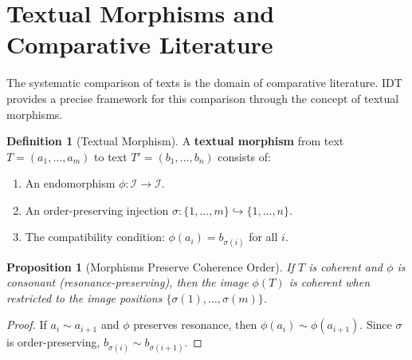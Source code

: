 \documentclass[11pt,openany]{book}
\theoremstyle{definition}
\newtheorem{definition}[axiom]{Definition}
\theoremstyle{plain}
\newtheorem{proposition}[axiom]{Proposition}
\theoremstyle{remark}
\newcommand{\IS}{\mathcal{I}}               %
\newcommand{\res}{\sim}                      %
\begin{document}
\section{Textual Morphisms and Comparative Literature}

The systematic comparison of texts is the domain of comparative literature. IDT provides a precise framework for this comparison through the concept of textual morphisms.

\begin{definition}[Textual Morphism]
A \textbf{textual morphism} from text $T = (a_1, \ldots, a_m)$ to text $T' = (b_1, \ldots, b_n)$ consists of:
\begin{enumerate}
\item An endomorphism $\phi : \IS \to \IS$.
\item An order-preserving injection $\sigma : \{1, \ldots, m\} \hookrightarrow \{1, \ldots, n\}$.
\item The compatibility condition: $\phi(a_i) = b_{\sigma(i)}$ for all $i$.
\end{enumerate}
\end{definition}

\begin{proposition}[Morphisms Preserve Coherence Order]
If $T$ is coherent and $\phi$ is consonant (resonance-preserving), then the image $\phi(T)$ is coherent when restricted to the image positions $\{\sigma(1), \ldots, \sigma(m)\}$.
\end{proposition}

\begin{proof}
If $a_i \res a_{i+1}$ and $\phi$ preserves resonance, then $\phi(a_i) \res \phi(a_{i+1})$. Since $\sigma$ is order-preserving, $b_{\sigma(i)} \res b_{\sigma(i+1)}$.
\end{proof}
\end{document}
